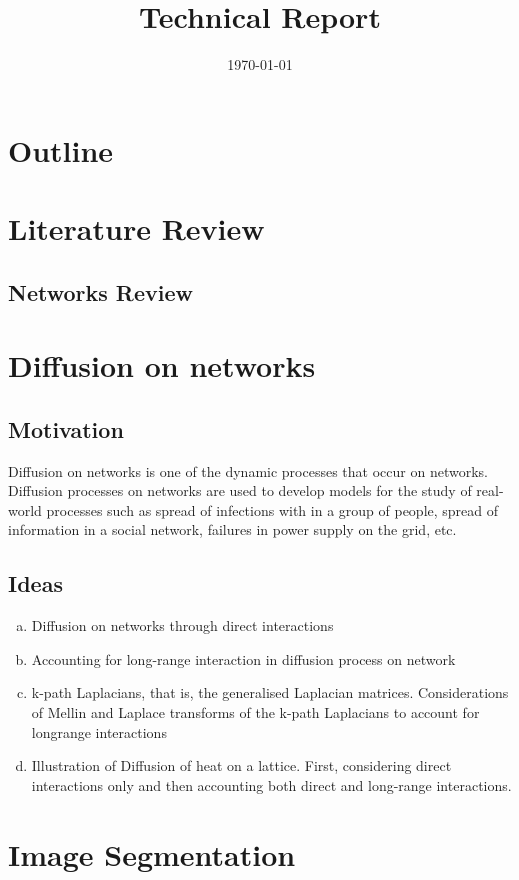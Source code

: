 \documentclass[10pt,a4paper]{article}
\title{Technical Report}
\date{\today}
\begin{document}
	\maketitle
	
	\vspace{1cm}
	\section*{Outline}
	\section{Literature Review}
	\subsection{Networks Review}
	\section{Diffusion on networks}
	\subsection{Motivation}
	Diffusion on networks is one of the dynamic processes that occur on networks. Diffusion processes on networks are used to develop models for the study of real-world processes such as spread of infections with in a group of people, spread of information in a social network, failures in power supply on the grid, etc.
	\subsection{Ideas}
	\begin{enumerate}[a)]
		\item  Diffusion on networks through direct interactions
		\item  Accounting for long-range interaction in diffusion process on network
		\item k-path Laplacians, that is, the generalised Laplacian matrices. Considerations of Mellin and Laplace transforms of the k-path Laplacians to account for longrange interactions
		\item Illustration of Diffusion of heat on a lattice. First, considering direct interactions only and then accounting both direct and long-range interactions. 
	\end{enumerate}
    \section{Image Segmentation}
\end{document}
